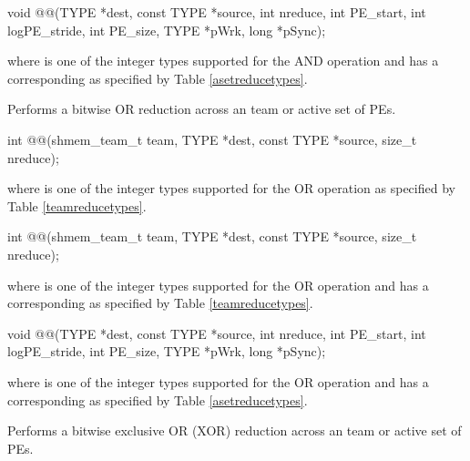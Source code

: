 \begin{apidefinition}
\begin{DeprecateBlock}
\begin{CsynopsisCol}
void @@(TYPE *dest, const TYPE *source, int nreduce, int PE_start, int logPE_stride, int PE_size, TYPE *pWrk, long *pSync);
\end{CsynopsisCol}
\end{DeprecateBlock}
where \TYPE{} is one of the integer types supported for the AND operation and has a corresponding \TYPENAME{} as specified by Table \ref{asetreducetypes}.

\label{subsec:shmem_or_reduce}
Performs a bitwise OR reduction across an \openshmem team or active set of \acp{PE}.\newline

\begin{C11synopsis}
int @@(shmem_team_t team, TYPE *dest, const TYPE *source, size_t nreduce);
\end{C11synopsis}
where \TYPE{} is one of the integer types supported for the OR operation as specified by Table \ref{teamreducetypes}.

\begin{Csynopsis}
\end{Csynopsis}
\begin{CsynopsisCol}
int @@(shmem_team_t team, TYPE *dest, const TYPE *source, size_t nreduce);
\end{CsynopsisCol}
where \TYPE{} is one of the integer types supported for the OR operation and has a corresponding \TYPENAME{} as specified by Table \ref{teamreducetypes}.

\begin{DeprecateBlock}
\begin{CsynopsisCol}
void @@(TYPE *dest, const TYPE *source, int nreduce, int PE_start, int logPE_stride, int PE_size, TYPE *pWrk, long *pSync);
\end{CsynopsisCol}
\end{DeprecateBlock}
where \TYPE{} is one of the integer types supported for the OR operation and has a corresponding \TYPENAME{} as specified by Table \ref{asetreducetypes}.

\label{subsec:shmem_xor_reduce}
Performs a bitwise exclusive OR (XOR) reduction across an \openshmem team or active set of \acp{PE}.\newline


\end{apidefinition}
